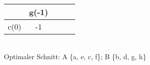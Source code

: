 \documentclass[a4paper]{article}
\begin{document}
	\begin{minipage}[t]{.48\textwidth}
		\begin{center}
			\begin{tabular}{c|cccc}
							&	g(-1)	\\\hline
					c(0)	&	-1
			\end{tabular}	
		\end{center}
	\end{minipage}\\
	Optimaler Schnitt: A \{a, e, c, f\}; B \{b, d, g, h\}
\end{document}
